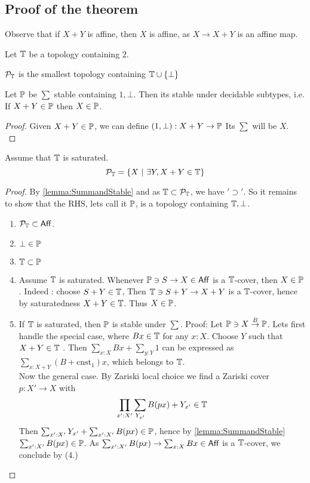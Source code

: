 \subsection{Proof of the theorem}
 Observe that if $X + Y$ is affine, then $X$ is affine, as $X \to X + Y$ is an affine map.

Let $\mathbb{T}$ be a topology containing $2$.%
\begin{definition}
	$\mathcal{P}_{\mathbb{T}}$ is the smallest topology containing $\mathbb{T} \cup \{\bot\}$
\end{definition}
\begin{lemma}{\label{lemma:SummandStable}}
	Let $\mathbb{P}$ be $\sum$ stable containing $1 , \bot$. Then its stable under decidable subtypes, i.e. If $X + Y \in \mathbb{P}$ then $X \in \mathbb{P}$.
\end{lemma}
\begin{proof}
	Given $X + Y \in \mathbb{P}$, we can define $(1, \bot) : X + Y \to \mathbb{P}$ Its $\sum$ will be $X$. \\
\end{proof}

\begin{prop}
	Assume that $\mathbb{T}$ is saturated. 	
	\[
	\mathcal{P}_{\mathbb{T}}= \{X  \ | \ \exists Y , X + Y \in \mathbb{T}\}
	\]
\end{prop}
\begin{proof}
	By \ref{lemma:SummandStable} and as $\mathbb{T} \subset \mathcal{P}_{\mathbb{T}}$, we have $'\supset'$. So it remains to show that the RHS, lets call it $\mathbb{P}$, is a topology containing $\mathbb{T}, \bot$.
%
\begin{enumerate}
	
	\item $\mathcal{P}_{\mathbb{T}} \subset \mathsf{Aff}$.
	\item $\bot \in \mathbb{P}$
	\item $\mathbb{T} \subset \mathbb{P}$
	\item Assume $\mathbb{T}$ is saturated. Whenever $\mathbb{P} \ni S \to X \in \mathsf{Aff}$ is a $\mathbb{T}$-cover, then $X \in \mathbb{P}$. Indeed : choose $S + Y \in \mathbb{T}$, Then $\mathbb{T} \ni S + Y \to X + Y$ is a $\mathbb{T}$-cover, hence by saturatedness $X + Y \in \mathbb{T}$. Thus $X \in \mathbb{P}$.
	\item If $\mathbb{T}$ is saturated, then $\mathbb{P}$ is stable under $\sum$. Proof:
	Let $\mathbb{P} \ni X \overset{B}{\to} \mathbb{P}$. Lets first handle the special case, where $B x \in \mathbb{T}$ for any $x : X$. Choose $Y$ such that $X + Y \in \mathbb{T}$ . Then $\sum_{x: X} B x + \sum_{y:Y} 1$ can be expressed as $\sum_{x : X + Y} (B + \mathrm{cnst}_1) x$, which belongs to $\mathbb{T}$. \\	 
	Now the general case. By Zariski local choice we find a Zariski cover $p : X' \to X$ with 
	\[
	\prod_{x' : X'} \sum_{Y_{x'}} B (p x) + Y_{x'} \in \mathbb{T}
	\]
	Then $\sum_{x' : X'} Y_{x'} + \sum_{x' : X'} B (p x) \in \mathbb{P}$, hence by \ref{lemma:SummandStable} $\sum_{x': X'} B (p x) \in \mathbb{P}$. As $\sum_{x': X'} B (p x) \to \sum_{x: X} B x \in \mathsf{Aff}$ is a $\mathbb{T}$-cover, we conclude by (4.)
\end{enumerate}
\end{proof}

